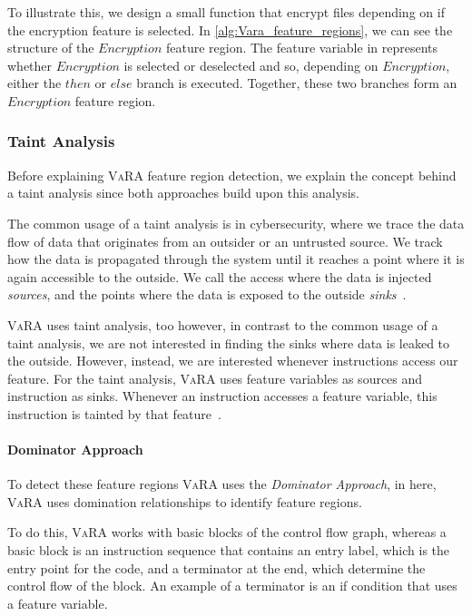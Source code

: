 To illustrate this, we design a small function that encrypt files depending on if the encryption feature is selected.
In \autoref{alg:Vara_feature_regions}, we can see the structure of the $Encryption$ feature region. 
The feature variable in  represents whether $Encryption$ is selected or deselected and so, depending on $Encryption$, 
either the $then$ or $else$ branch is executed. 
Together, these two branches form an $Encryption$ feature region.

\subsubsection{Taint Analysis}
Before explaining \textsc{VaRA} feature region detection, we explain the concept behind a taint analysis since both approaches build upon this analysis.

The common usage of a taint analysis is in cybersecurity, where we trace the data flow of data that originates from an outsider or an untrusted source.
We track how the data is propagated through the system until it reaches a point where it is again accessible to the outside.
We call the access where the data is injected \emph{sources}, and the points where the data is exposed to the outside \emph{sinks}~\cite{TaintAnalysis}.

\textsc{VaRA} uses taint analysis, too however, in contrast to the common usage of a taint analysis, 
we are not interested in finding the sinks where data is leaked to the outside. However, instead, we are interested whenever instructions access our feature. 
For the taint analysis, \textsc{VaRA} uses feature variables as sources and instruction as sinks. Whenever an instruction accesses a feature variable, 
this instruction is tainted by that feature~\cite{VaRA-Janik}.

\paragraph{Dominator Approach}
To detect these feature regions \textsc{VaRA} uses the \emph{Dominator Approach}, in here, \textsc{VaRA} uses domination relationships to identify feature regions.

To do this, \textsc{VaRA} works with basic blocks of the control flow graph, whereas a basic block is an instruction sequence that contains an entry label, 
which is the entry point for the code, and a terminator at the end, which determine the control flow of the block. 
An example of a terminator is an if condition that uses a feature variable.

